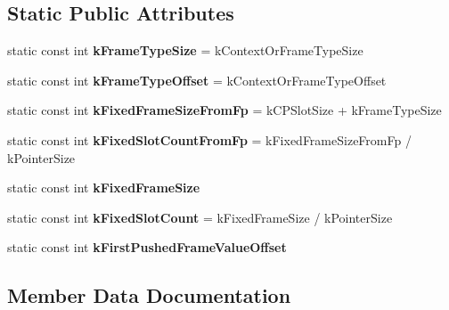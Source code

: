 \subsection*{Static Public Attributes}
\begin{DoxyCompactItemize}
\item 
static const int {\bfseries k\+Frame\+Type\+Size} = k\+Context\+Or\+Frame\+Type\+Size\hypertarget{classv8_1_1internal_1_1_typed_frame_constants_a9f27a6c849e2c3314dbc319b3027d5d5}{}\label{classv8_1_1internal_1_1_typed_frame_constants_a9f27a6c849e2c3314dbc319b3027d5d5}

\item 
static const int {\bfseries k\+Frame\+Type\+Offset} = k\+Context\+Or\+Frame\+Type\+Offset\hypertarget{classv8_1_1internal_1_1_typed_frame_constants_a2138876a293d0bc304765b34c2ebca43}{}\label{classv8_1_1internal_1_1_typed_frame_constants_a2138876a293d0bc304765b34c2ebca43}

\item 
static const int {\bfseries k\+Fixed\+Frame\+Size\+From\+Fp} = k\+C\+P\+Slot\+Size + k\+Frame\+Type\+Size\hypertarget{classv8_1_1internal_1_1_typed_frame_constants_ab41b085b82a3b368e1e7e7cb628f13d3}{}\label{classv8_1_1internal_1_1_typed_frame_constants_ab41b085b82a3b368e1e7e7cb628f13d3}

\item 
static const int {\bfseries k\+Fixed\+Slot\+Count\+From\+Fp} = k\+Fixed\+Frame\+Size\+From\+Fp / k\+Pointer\+Size\hypertarget{classv8_1_1internal_1_1_typed_frame_constants_ad402324eef4b1d9574e944b82493d63d}{}\label{classv8_1_1internal_1_1_typed_frame_constants_ad402324eef4b1d9574e944b82493d63d}

\item 
static const int {\bfseries k\+Fixed\+Frame\+Size}
\item 
static const int {\bfseries k\+Fixed\+Slot\+Count} = k\+Fixed\+Frame\+Size / k\+Pointer\+Size\hypertarget{classv8_1_1internal_1_1_typed_frame_constants_aa1dcdbaffcbd606b54b92537b06237d2}{}\label{classv8_1_1internal_1_1_typed_frame_constants_aa1dcdbaffcbd606b54b92537b06237d2}

\item 
static const int {\bfseries k\+First\+Pushed\+Frame\+Value\+Offset}
\end{DoxyCompactItemize}


\subsection{Member Data Documentation}
